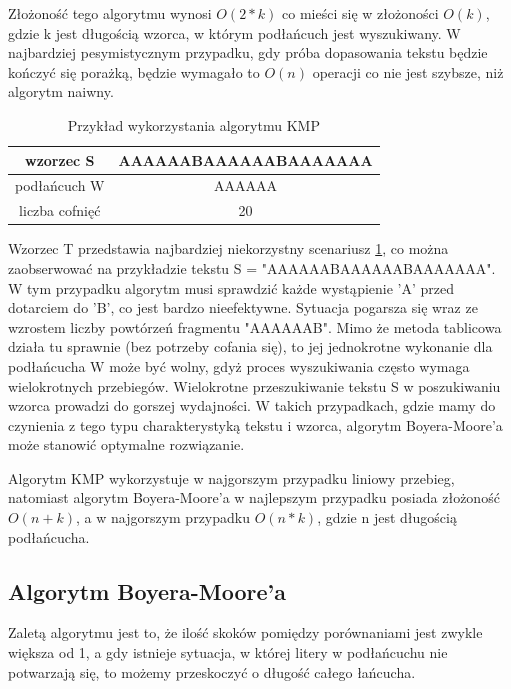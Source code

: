 Złożoność tego algorytmu wynosi $O(2*{k})$ co mieści się w złożoności $O({k})$,
gdzie k jest długością wzorca, w którym podłańcuch jest wyszukiwany. W 
najbardziej pesymistycznym przypadku, gdy próba dopasowania tekstu będzie 
kończyć się porażką, będzie wymagało to $O({n})$ operacji co nie jest szybsze,
niż algorytm naiwny. 

\begin{table}
  \centering
  \begin{tabular}{ |c|c|  } 
    \hline
    wzorzec S & AAAAAABAAAAAABAAAAAAA \\
    \hline
    podłańcuch W & AAAAAA \\
    \hline
    liczba cofnięć & 20 \\
    \hline
  \end{tabular}
  \caption{Przykład wykorzystania algorytmu KMP}
  \label{tabela:KMPExampleSlow}
\end{table}

Wzorzec T przedstawia najbardziej niekorzystny scenariusz 
\ref{tabela:KMPExampleSlow}, co można zaobserwować na przykładzie tekstu 
S = "AAAAAABAAAAAABAAAAAAA". W tym przypadku algorytm musi sprawdzić każde
wystąpienie 'A' przed dotarciem do 'B', co jest bardzo nieefektywne. Sytuacja 
pogarsza się wraz ze wzrostem liczby powtórzeń fragmentu "AAAAAAB". Mimo że 
metoda tablicowa działa tu sprawnie (bez potrzeby cofania się), to jej 
jednokrotne wykonanie dla podłańcucha W może być wolny, gdyż proces
wyszukiwania często wymaga wielokrotnych przebiegów. Wielokrotne przeszukiwanie
tekstu S w poszukiwaniu wzorca prowadzi do gorszej wydajności. W takich 
przypadkach, gdzie mamy do czynienia z tego typu charakterystyką tekstu 
i wzorca, algorytm Boyera-Moore'a może stanowić optymalne rozwiązanie.

Algorytm KMP wykorzystuje w najgorszym przypadku liniowy przebieg, natomiast
algorytm Boyera-Moore'a w najlepszym przypadku posiada złożoność $O(n+k)$, a w 
najgorszym przypadku $O(n*k)$, gdzie n jest długością podłańcucha.

\subsection{Algorytm Boyera-Moore'a}
\label{sch:algoBoyerMoore}

Zaletą algorytmu jest to, że ilość skoków pomiędzy porównaniami jest zwykle 
większa od 1, a gdy istnieje sytuacja, w której litery w podłańcuchu nie
potwarzają się, to możemy przeskoczyć o długość całego łańcucha.

